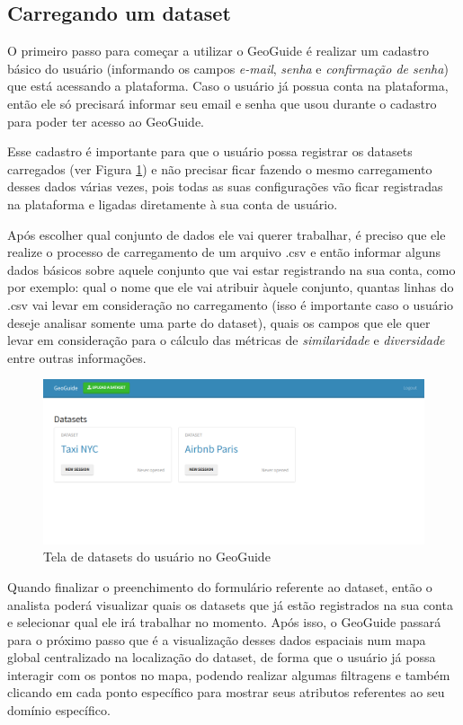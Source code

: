 \subsection{Carregando um dataset}

O primeiro passo para começar a utilizar o GeoGuide é realizar um cadastro básico do usuário (informando os campos \textit{e-mail}, \textit{senha} e \textit{confirmação de senha}) que está acessando a plataforma. Caso o usuário já possua conta na plataforma, então ele só precisará informar seu email e senha que usou durante o cadastro para poder ter acesso ao GeoGuide.

Esse cadastro é importante para que o usuário possa registrar os datasets carregados (ver Figura \ref{fig:geoguide-datasets}) e não precisar ficar fazendo o mesmo carregamento desses dados várias vezes, pois todas as suas configurações vão ficar registradas na plataforma e ligadas diretamente à sua conta de usuário.

Após escolher qual conjunto de dados ele vai querer trabalhar, é preciso que ele realize o processo de carregamento de um arquivo .csv e então informar alguns dados básicos sobre aquele conjunto que vai estar registrando na sua conta, como por exemplo: qual o nome que ele vai atribuir àquele conjunto, quantas linhas do .csv vai levar em consideração no carregamento (isso é importante caso o usuário deseje analisar somente uma parte do dataset), quais os campos que ele quer levar em consideração para o cálculo das métricas de \textit{similaridade} e \textit{diversidade} entre outras informações.

\begin{figure}[]
	\centering
	\includegraphics[width=\textwidth]{images/geoguide-datasets.png}
	\caption{Tela de datasets do usuário no GeoGuide}
	\label{fig:geoguide-datasets}
	\vspace{-10pt}
\end{figure}

Quando finalizar o preenchimento do formulário referente ao dataset, então o analista poderá visualizar quais os datasets que já estão registrados na sua conta e selecionar qual ele irá trabalhar no momento. Após isso, o GeoGuide passará para o próximo passo que é a visualização desses dados espaciais num mapa global centralizado na localização do dataset, de forma que o usuário já possa interagir com os pontos no mapa, podendo realizar algumas filtragens e também clicando em cada ponto específico para mostrar seus atributos referentes ao seu domínio específico.

